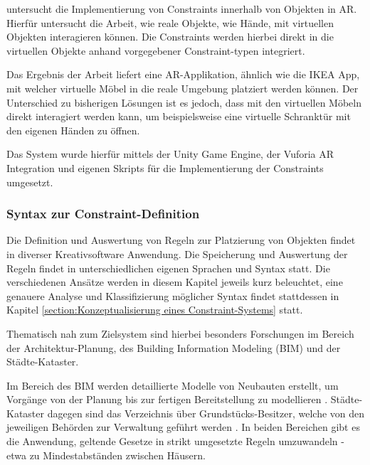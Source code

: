 \medskip

\textcite{vassionInvestigatingConstrainedObjects} untersucht die Implementierung von Constraints innerhalb von Objekten in AR. Hierfür untersucht die Arbeit, wie reale Objekte, wie Hände, mit virtuellen Objekten interagieren können. Die Constraints werden hierbei direkt in die virtuellen Objekte anhand vorgegebener Constraint-typen integriert.

Das Ergebnis der Arbeit liefert eine AR-Applikation, ähnlich wie die IKEA App, mit welcher virtuelle Möbel in die reale Umgebung platziert werden können. Der Unterschied zu bisherigen Lösungen ist es jedoch, dass mit den virtuellen Möbeln direkt interagiert werden kann, um beispielsweise eine virtuelle Schranktür mit den eigenen Händen zu öffnen.

Das System wurde hierfür mittels der Unity Game Engine, der Vuforia AR Integration und eigenen Skripts für die Implementierung der Constraints umgesetzt.

\medskip

\subsubsection{Syntax zur Constraint-Definition}

Die Definition und Auswertung von Regeln zur Platzierung von Objekten findet in diverser Kreativsoftware Anwendung. Die Speicherung und Auswertung der Regeln findet in unterschiedlichen eigenen Sprachen und Syntax statt. Die verschiedenen Ansätze werden in diesem Kapitel jeweils kurz beleuchtet, eine genauere Analyse und Klassifizierung möglicher Syntax findet stattdessen in Kapitel \ref{section:Konzeptualisierung eines Constraint-Systems} statt.

Thematisch nah zum Zielsystem sind hierbei besonders Forschungen im Bereich der Architektur-Planung, des Building Information Modeling (BIM) und der Städte-Kataster.

Im Bereich des BIM werden detaillierte Modelle von Neubauten erstellt, um Vorgänge von der Planung bis zur fertigen Bereitstellung zu modellieren \parencite{tuevsuedagWasIstBIM2025}. Städte-Kataster dagegen sind das Verzeichnis über Grundstücks-Besitzer, welche von den jeweiligen Behörden zur Verwaltung geführt werden \textcite{buettnerWasIstKataster2021}. In beiden Bereichen gibt es die Anwendung, geltende Gesetze in strikt umgesetzte Regeln umzuwandeln - etwa zu Mindestabständen zwischen Häusern.

\medskip

